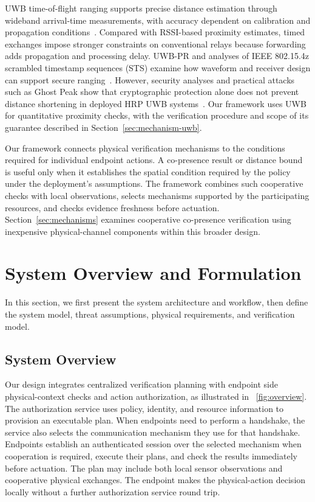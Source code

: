\documentclass[sigconf,authordraft]{acmart}
\begin{document}
UWB time-of-flight ranging supports precise distance estimation through wideband arrival-time measurements, with accuracy dependent on calibration and propagation conditions~\cite{ieee2020uwb,jimenez2017comparing}.
Compared with RSSI-based proximity estimates, timed exchanges impose stronger constraints on conventional relays because forwarding adds propagation and processing delay.
UWB-PR and analyses of IEEE 802.15.4z scrambled timestamp sequences (STS) examine how waveform and receiver design can support secure ranging~\cite{singh2019uwb,luo2024secure}.
However, security analyses and practical attacks such as Ghost Peak show that cryptographic protection alone does not prevent distance shortening in deployed HRP UWB systems~\cite{singh2021security,leu2022ghost}.
Our framework uses UWB for quantitative proximity checks, with the verification procedure and scope of its guarantee described in Section~\ref{sec:mechanism-uwb}.

Our framework connects physical verification mechanisms to the conditions required for individual endpoint actions.
A co-presence result or distance bound is useful only when it establishes the spatial condition required by the policy under the deployment's assumptions.
The framework combines such cooperative checks with local observations, selects mechanisms supported by the participating resources, and checks evidence freshness before actuation.
Section~\ref{sec:mechanisms} examines cooperative co-presence verification using inexpensive physical-channel components within this broader design.

\section{System Overview and Formulation}
\label{sec:formulation}


In this section, we first present the system architecture and workflow, then define the system model, threat assumptions, physical requirements, and verification model.

\subsection{System Overview}
\label{sec:approach-overview}

Our design integrates centralized verification planning with endpoint side physical-context checks and action authorization, as illustrated in \figurename~\ref{fig:overview}.
The authorization service uses policy, identity, and resource information to provision an executable plan.
When endpoints need to perform a handshake, the service also selects the communication mechanism they use for that handshake.
Endpoints establish an authenticated session over the selected mechanism when cooperation is required, execute their plans, and check the results immediately before actuation.
The plan may include both local sensor observations and cooperative physical exchanges.
The endpoint makes the physical-action decision locally without a further authorization service round trip.
\end{document}
